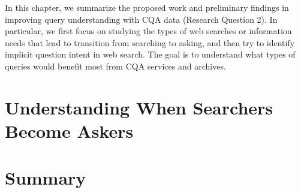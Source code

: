 %



\noindent
In this chapter, we summarize the proposed work and preliminary findings in improving query understanding with CQA data (Research Question 2). In particular, we first focus on studying the types of web searches or information needs that lead to transition from searching to asking, and then try to identify implicit question intent in web search. The goal is to understand what types of queries would benefit most from CQA services and archives.



\section{Understanding When Searchers Become Askers}



\section{Summary}

